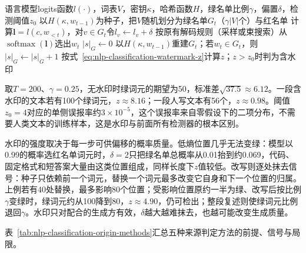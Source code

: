 \begin{algorithm}[绿名单水印的生成与检测]
  \label{alg:nlp-classification-watermark}
  \begin{algorithmic}[1]
    \Require 语言模型logits函数$l(\cdot)$，词表$V$，密钥$\kappa$，哈希函数$H$，绿名单比例$\gamma$，偏置$\delta$，检测阈值$z_0$
        \State 以$H(\kappa,w_{t-1})$为种子，把$V$随机划分为绿名单$G_t$（$\gamma|V|$个）与红名单
        \State 计算$\bm l=l(c,w_{<t})$，对$v\in G_t$令$l_v\gets l_v+\delta$
        \State 按原有解码规则（采样或束搜索）从$\operatorname{softmax}(\bm l)$选出$w_t$
      \EndFor
    \EndProcedure
      \State $|s|_G\gets0$
        \State 以$H(\kappa,w_{t-1})$重建$G_t$；若$w_t\in G_t$，则$|s|_G\gets|s|_G+1$
      \EndFor
      \State 按式~\eqref{eq:nlp-classification-watermark-z}计算$z$；$z>z_0$时判为含水印
    \EndProcedure
  \end{algorithmic}
\end{algorithm}

取$T=200$、$\gamma=0.25$，无水印时绿词元的期望为50，标准差$\sqrt{37.5}\approx6.12$。一段含水印的文本若有100个绿词元，$z\approx8.16$；一段人写文本有56个，$z\approx0.98$。阈值$z_0=4$对应的单侧误报率约$3\times10^{-5}$，这个误报率来自零假设下的二项分布，不需要人类文本的训练样本，这是水印与前面所有检测器的根本区别。

水印的强度取决于每一步可供偏移的概率质量。低熵位置几乎无法变绿：模型以0.99的概率选红名单词元时，$\delta=2$只把绿名单总概率从0.01抬到约0.069，代码、固定格式和短答案大量由这类位置组成，同样长度下$z$值较低。改写则逐处抹去信号：种子只依赖前一个词元，替换一个词元最多改变它自身和下一个位置的归属。上例若有40处替换，最多影响80个位置；受影响位置原约一半为绿、改写后按比例$\gamma$变绿时，绿词元约从100降到80，$z\approx4.90$，仍可检出；整段复述则使绿词元比例退回$\gamma$。水印只对配合的生成方有效，$\delta$越大越难抹去，也越可能改变生成质量。

表~\ref{tab:nlp-classification-origin-methods}汇总五种来源判定方法的前提、信号与局限。

